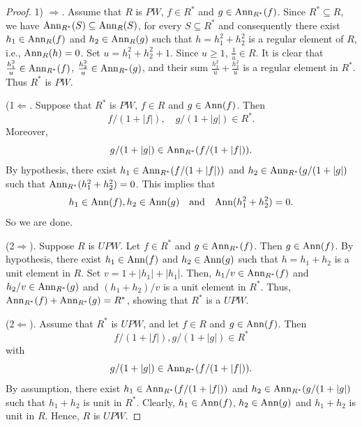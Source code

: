 \documentclass{amsart}
\theoremstyle{definition}
\theoremstyle{remark}
\numberwithin{equation}{section}
\newcommand{\Ann}{{\rm Ann}}
\newcommand{\sub}{\supseteq}
\newcommand{\RTA}{\Rightarrow}
\newcommand{\LTA}{\Leftarrow}
\def\sub {\subseteq}
\def\RTA {\Rightarrow }
\def\LTA {\Leftarrow }
\theoremstyle{definition}\newtheorem{thm}{Theorem}[section]
\theoremstyle{definition}\newtheorem{cor}[thm]{Corollary}
\theoremstyle{definition}\newtheorem{lem}[thm]{Lemma}
\theoremstyle{definition}\newtheorem{prop}[thm]{Proposition}
\theoremstyle{definition}\newtheorem{defn}[thm]{Definition}
\theoremstyle{definition}\newtheorem{Rem}[thm]{Remark}
\theoremstyle{remark}\newtheorem{rem}[thm]{Remark}
\theoremstyle{definition}\newtheorem{exam}[thm]{Example}
\theoremstyle{definition}\newtheorem{qu}[thm]{question}
\begin{document}
\begin{proof}
 1) $\RTA$. 
Assume that $R$ is $PW$, $f\in R^*$ and $g\in\Ann_{R^*}(f)$. Since $R^*\sub R$, we have $\Ann_{R^*}(S)\sub\Ann_R(S)$, for every $S\subseteq R^*$ and consequently there exist $h_1\in\Ann_R(f)$ and $h_2\in\Ann_R(g)$ such that $h=h_1^2+h_2^2$ is a regular element of $R$, i.e., $\Ann_R(h)=0$. Set $u=h_1^2+h_2^2+1$. Since $u\geq1$, $\frac{1}{u}\in R$. It is clear that $\frac{h_1^2}{u}\in\Ann_{R^*}(f)$, $\frac{h_2^2}{u}\in\Ann_{R^*}(g)$, and their sum $\frac{h_1^2}{u}+\frac{h_2^2}{u}$ is a regular element in $R^*$. Thus $R^*$ is $PW$.


(1$\LTA$. Suppose that $R^*$ is $PW$, $f\in R$ and $g\in\Ann(f)$. Then \[f/(1+|f|), \quad  g/(1+|g|)\in R^*.\] Moreover, \[g/(1+|g|)\in\Ann_{R^*}(f/(1+|f|)).\] By hypothesis, there exist $h_1\in\Ann_{R^*}(f/(1+|f|))$ and $h_2\in\Ann_{R^*}(g/(1+|g|)$ such that $\Ann_{R^*}(h_1^2+ h_2^2)=0$. This implies that \[h_1\in \Ann(f),  h_2\in\Ann(g)\quad \text{and}\quad \Ann(h_1^2+ h_2^2)=0.\] So we are done.

(2$\RTA$). Suppose $R$ is $UPW$. Let $f\in R^*$ and $g\in\Ann_{R^*}(f)$. Then $g\in \Ann(f)$. By hypothesis, there exist $h_1\in\Ann(f)$ and $h_2\in\Ann(g)$ such that $h=h_1+ h_2$ is a unit element in $R$. Set $v= 1+|h_1|+ |h_1|$. Then,  $h_1/ v\in\Ann_{R^*}(f)$ and $h_2/v\in\Ann_{R^*}(g)$ and $(h_1 + h_2)/v$ is a unit element in $R^*$. Thus, $\Ann_{R^*}(f)+\Ann_{R^*}(g)=R^*$, showing that $R^*$ is a $UPW$.

(2$\LTA$). Assume that $R^*$ is $UPW$, and let $f\in R$ and $g\in\Ann(f)$. Then \[f/(1+|f|), g/(1+|g|)\in R^*\]with\[g/(1+|g|)\in\Ann_{R^*}(f/(1+|f|)).\] By assumption, there exist $h_1\in\Ann_{R^*}(f/(1+|f|))$ and $h_2\in\Ann_{R^*}(g/(1+|g|)$ such that $h_1+ h_2$ is unit in $R^*$. Clearly, $h_1\in \Ann(f)$,  $h_2\in\Ann(g)$ and $h_1+ h_2$ is unit in $R$. Hence, $R$ is $UPW$.
\end{proof}
\end{document}
